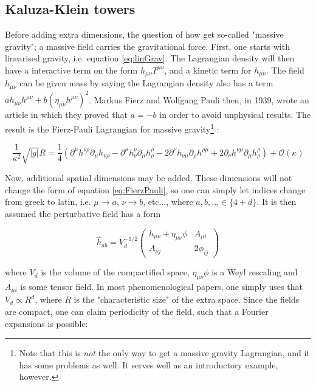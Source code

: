 \documentclass[11pt,a4paper]{article}
\begin{document}
\subsection{Kaluza-Klein towers}

Before adding extra dimensions, the question of how get so-called "massive gravity"; a massive field carries the gravitational force. First, one starts with linearised gravity, i.e. equation \ref{eq:linGrav}. The Lagrangian density will then have a interactive term on the form $h_{\mu\nu}T^{\mu\nu}$, and a kinetic term for $h_ {\mu\nu}$. The field $h_{\mu\nu}$ can be given mass by saying the Lagrangian density also has a term $ah_{\mu\nu}h^{\mu\nu} + b(\eta_{\mu\nu}h^{\mu\nu})^2$. Markus Fierz and Wolfgang Pauli then, in 1939, wrote an article\cite{FP} in which they proved that $a=-b$ in order to avoid unphysical results. The result is the Fierz-Pauli Lagrangian for massive gravity\footnote{Note that this is \emph{not} the only way to get a massive gravity Lagrangian, and it has some problems as well. It serves well as an introductory example, however.} \cite{HLZ}:

\begin{equation}
	\frac{1}{\kappa^2}\sqrt{|g|}R = \frac{1}{4}\left( \partial^\mu h^{\nu\rho}\partial_\mu h_{\nu\rho} - \partial^\mu h^{\nu}_{\nu}\partial_\mu h^\rho_{\rho} - 2\partial^\nu h_{\nu\mu}\partial_\rho h^{\rho\mu} + 2\partial_\nu h^{\nu\mu}\partial_\mu h^{\rho}_{\rho} \right) + \mathcal{O}(\kappa)
	\label{eq:FierzPauli}
\end{equation}

Now, additional spatial dimensions may be added. These dimensions will not change the form of equation \ref{eq:FierzPauli}, so one can simply let indices change from greek to latin, i.e. $\mu\rightarrow a$, $\nu\rightarrow b$, etc..., where $a,b,\ldots \in \{4+d\}$. It is then assumed the perturbative field has a form

\begin{equation}
	\hat{h}_{ab} = 
	V_d^{-1/2}\begin{pmatrix}
	h_{\mu\nu} + \eta_{\mu\nu}\phi & A_{\mu i}\\
	A_{\nu j} & 2\phi_{ij}
	\end{pmatrix}
\end{equation}

where $V_d$ is the volume of the compactified space, $\eta_{\mu\nu}\phi$ is a Weyl rescaling and $A_{\mu i}$ is some tensor field. In most phenomenological papers, one simply uses that $V_d\propto R^d$, where $R$ is the "characteristic size" of the extra space. Since the fields are compact, one can claim periodicity of the field, such that a Fourier expansions is possible:
\end{document}
